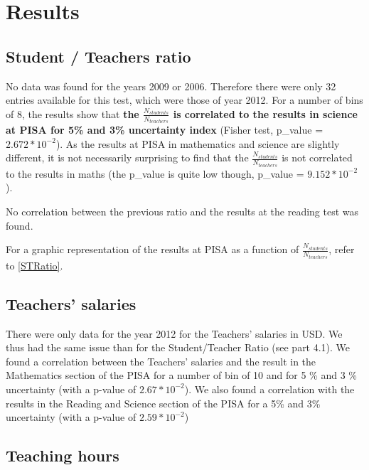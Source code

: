 \documentclass[12pt,a4paper]{article}
\begin{document}
\section{Results}

\subsection{Student / Teachers ratio}

No data was found for the years 2009 or 2006. Therefore there were only 32 entries available for this test, which were those of year 2012.
For a number of bins of 8, the results show that \textbf{the $\frac{N_{students}}{N_{teachers}}$ is correlated to the results in science at PISA for 5\% and 3\% uncertainty index} (Fisher test, p\_value = $2.672*10^{-2}$). As the results at PISA in mathematics and science are slightly different, it is not necessarily surprising to find that the $\frac{N_{students}}{N_{teachers}}$ is not correlated to the results in maths (the p\_value is quite low though, p\_value = $9.152*10^{-2}$).

No correlation between the previous ratio and the results at the reading test was found.

For a graphic representation of the results at PISA as a function of $\frac{N_{students}}{N_{teachers}}$, refer to \ref{STRatio}.

\subsection{Teachers’ salaries}

There were only data for the year 2012 for the Teachers’ salaries in USD. We thus had the same issue than for the Student/Teacher Ratio (see part 4.1). We found a correlation between the Teachers’ salaries and the result in the Mathematics section of the PISA for a number of bin of 10 and for 5 \% and 3 \% uncertainty (with a p-value of $2.67*10^{-2}$). We also found a correlation with the results in the Reading and Science section of the PISA for a 5\% and 3\% uncertainty (with a p-value of $2.59*10^{-2}$)

\subsection{Teaching hours}
\end{document}
